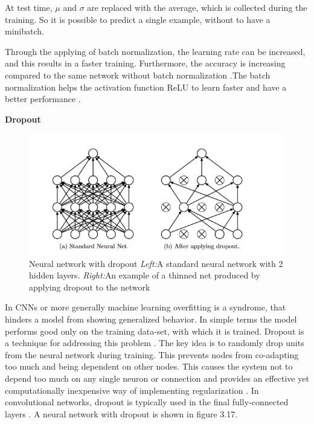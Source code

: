 At test time, $ \mu $ and $\sigma$ are replaced with the average, which is collected during the training. So it is possible to predict a single example, without to have a minibatch.

Through the applying of batch normalization, the learning rate can be increased, and this results in a faster training. Furthermore, the accuracy is increasing compared to the same network without batch normalization \cite{ioffe2015batch}.The batch normalization helps the activation function ReLU to learn faster and have a better performance \cite{ioffe2015batch}.

\textbf{Dropout}
\begin{figure}[h]
	\includegraphics[width=\textwidth]{Figures/Section3_Dropout.png} 
	\centering
	\caption{Neural network with dropout  \textit{Left:}A standard neural network with 2 hidden layers. \textit{Right:}An example of a thinned net produced by applying dropout to the network \cite{srivastava2014dropout}}
	\label{fig:dropout}
\end{figure}

In CNNs or more generally machine learning overfitting is a syndrome, that hinders a model from showing generalized behavior. In simple terms the model performs good only on the training data-set, with which it is trained. Dropout is a technique for addressing this problem \cite{srivastava2014dropout}.  The key idea is to randomly drop units from the neural network during training. This prevents nodes from co-adapting too much and being dependent on
other nodes. This causes the system not to depend too much on any single neuron or connection and provides an effective yet computationally inexpensive way of implementing regularization \cite{goodfellow2016deep}.  In convolutional networks, dropout is typically used in the final fully-connected layers \cite{simonyan2014very}.  A neural network with dropout is shown in figure 3.17.


